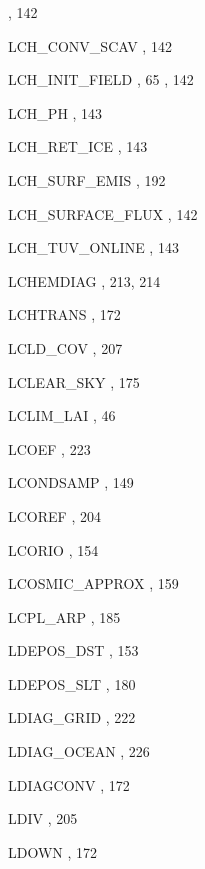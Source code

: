 \begin{theindex}
    \subitem {},  142
  \item LCH\_CONV\_SCAV
    \subitem {},  142
  \item LCH\_INIT\_FIELD
    \subitem {},  65
    \subitem {},  142
  \item LCH\_PH
    \subitem {},  143
  \item LCH\_RET\_ICE
    \subitem {},  143
  \item LCH\_SURF\_EMIS
    \subitem {},  192
  \item LCH\_SURFACE\_FLUX
    \subitem {},  142
  \item LCH\_TUV\_ONLINE
    \subitem {},  143
  \item LCHEMDIAG
    \subitem {},  213, 214
  \item LCHTRANS
    \subitem {},  172
  \item LCLD\_COV
    \subitem {},  207
  \item LCLEAR\_SKY
    \subitem {},  175
  \item LCLIM\_LAI
    \subitem {},  46
  \item LCOEF
    \subitem {},  223
  \item LCONDSAMP
    \subitem {},  149
  \item LCOREF
    \subitem {},  204
  \item LCORIO
    \subitem {},  154
  \item LCOSMIC\_APPROX 
    \subitem {},  159
  \item LCPL\_ARP
    \subitem {},  185
  \item LDEPOS\_DST
    \subitem {},  153
  \item LDEPOS\_SLT
    \subitem {},  180
  \item LDIAG\_GRID
    \subitem {},  222
  \item LDIAG\_OCEAN
    \subitem {},  226
  \item LDIAGCONV
    \subitem {},  172
  \item LDIV
    \subitem {},  205
  \item LDOWN
    \subitem {},  172

\end{theindex}
